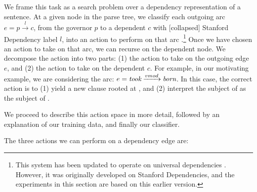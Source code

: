 
We frame this task as a search problem over a dependency representation of a sentence.
At a given node in the parse tree, we classify each outgoing arc
  $e = p \xrightarrow{l} c$, from the governor $p$ to a dependent $c$ 
  with [collapsed] Stanford Dependency label $l$,
  into an action to perform on that arc \cite{key:stanford-dep}.\footnote{
    This system has been updated to operate on universal dependencies \cite{key:stanford-ud}.
    However, it was originally developed on Stanford Dependencies, and the experiments in this
      section are based on this earlier version.
  }
Once we have chosen an action to take on that arc, we can recurse on the
  dependent node.
We decompose the action into two parts: (1) the action to take on the outgoing
  edge $e$, and (2) the action to take on the
  dependent $c$.
For example, in our motivating example, we are considering the arc:
  $e = \textit{took} \xrightarrow{vmod} \textit{born}$.
In this case, the correct action is to
  (1) yield a new clause rooted at ,
  and (2) interpret the subject of  as the subject
  of .



We proceed to describe this action space in more detail, followed by an
  explanation of our training data, and finally our classifier.

%
%
The three actions we can perform on a dependency edge are:

